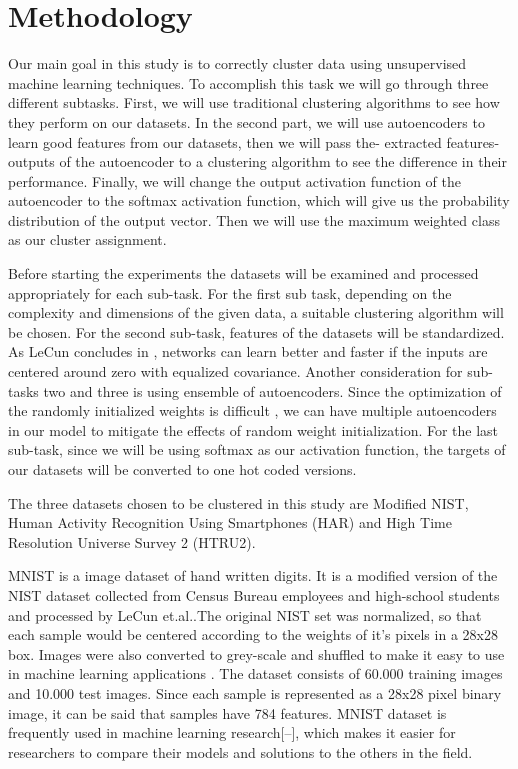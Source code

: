 \documentclass[journal]{IEEEtran}
\begin{document}
\section{Methodology}
Our main goal in this study is to correctly cluster data using unsupervised machine learning techniques.
To accomplish this task we will go through three different subtasks. First, we will use traditional clustering algorithms 
to see how they perform on our datasets. In the second part, we will use autoencoders to learn good features
from our datasets, then we will pass the- extracted features- outputs of the autoencoder to a clustering algorithm to see the difference
in their performance. Finally, we will change the output activation function of the autoencoder to the softmax 
activation function, which will give us the probability distribution of the output vector. Then we will use
the maximum weighted class as our cluster assignment.\par
Before starting the experiments the datasets will be examined and processed appropriately for each sub-task.
For the first sub task, depending on the complexity and dimensions of the given data, a suitable clustering algorithm will be chosen.
For the second sub-task, features of the datasets will be standardized. As LeCun concludes in \cite{lecun2012efficient}, networks
can learn better and faster if the inputs are centered around zero with equalized covariance. Another consideration for sub-tasks
two and three is using ensemble of autoencoders. Since the optimization of the randomly initialized weights is 
difficult \cite{hinton2006reducing}, we can have multiple autoencoders in our model to mitigate the effects of random weight initialization.
For the last sub-task, since we will be using softmax as our activation function, the targets of our datasets will be 
converted to one hot coded versions.\par

The three datasets chosen to be clustered in this study are Modified NIST, Human Activity Recognition Using Smartphones (HAR) 
and High Time Resolution Universe Survey 2 (HTRU2).\par

MNIST is a image dataset of hand written digits. It is a modified version of the NIST dataset collected from Census Bureau employees and high-school
students and processed by LeCun et.al..The original NIST set was normalized, so that each sample would be centered
according to the weights of it's pixels in a 28x28 box. Images were also converted to grey-scale and shuffled to make it
easy to use in machine learning applications \cite{lecun1998gradient}. The dataset consists of 60.000 training images and 10.000 test images. Since each
sample is represented as a 28x28 pixel binary image, it can be said that samples have 784 features. MNIST dataset is frequently
used in machine learning research[--], which makes it easier for researchers to compare their models and solutions to the others
in the field.
\end{document}
